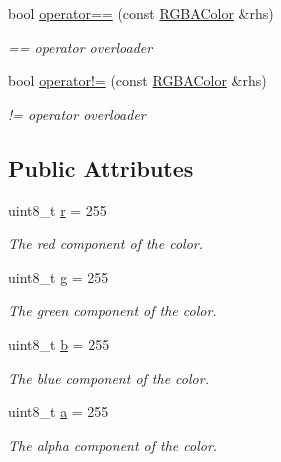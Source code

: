 \begin{DoxyCompactItemize}
bool \hyperlink{struct_r_g_b_a_color_a8bad14391669eefbba155db49757b5c6}{operator==} (const \hyperlink{struct_r_g_b_a_color}{R\+G\+B\+A\+Color} \&rhs)
\begin{DoxyCompactList}\small\item\em == operator overloader \end{DoxyCompactList}\item 
bool \hyperlink{struct_r_g_b_a_color_a5e327a23436aa072a58003f0033729b1}{operator!=} (const \hyperlink{struct_r_g_b_a_color}{R\+G\+B\+A\+Color} \&rhs)
\begin{DoxyCompactList}\small\item\em != operator overloader \end{DoxyCompactList}\end{DoxyCompactItemize}
\subsection*{Public Attributes}
\begin{DoxyCompactItemize}
\item 
\mbox{\label{struct_r_g_b_a_color_a575c7cb6c9ea4bf269d66c1ee7ae2901}} 
uint8\+\_\+t \hyperlink{struct_r_g_b_a_color_a575c7cb6c9ea4bf269d66c1ee7ae2901}{r} = 255
\begin{DoxyCompactList}\small\item\em The red component of the color. \end{DoxyCompactList}\item 
\mbox{\label{struct_r_g_b_a_color_a7d0de3f651397899480c902cbbba39c2}} 
uint8\+\_\+t \hyperlink{struct_r_g_b_a_color_a7d0de3f651397899480c902cbbba39c2}{g} = 255
\begin{DoxyCompactList}\small\item\em The green component of the color. \end{DoxyCompactList}\item 
\mbox{\label{struct_r_g_b_a_color_a1574ab45c8659742237c678a80ca00dc}} 
uint8\+\_\+t \hyperlink{struct_r_g_b_a_color_a1574ab45c8659742237c678a80ca00dc}{b} = 255
\begin{DoxyCompactList}\small\item\em The blue component of the color. \end{DoxyCompactList}\item 
\mbox{\label{struct_r_g_b_a_color_a594c214be1819bcd7f70b7246fb578f8}} 
uint8\+\_\+t \hyperlink{struct_r_g_b_a_color_a594c214be1819bcd7f70b7246fb578f8}{a} = 255
\begin{DoxyCompactList}\small\item\em The alpha component of the color. \end{DoxyCompactList}\end{DoxyCompactItemize}


